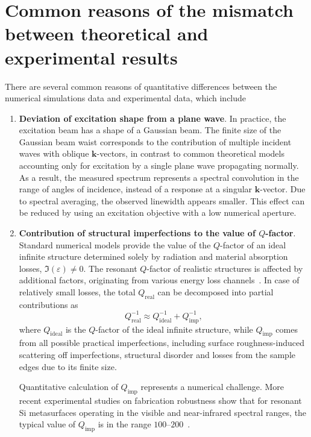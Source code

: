 \documentclass[
    reprint,
    superscriptaddress,
    a4paper,
    amsmath,amssymb,
    prb,
]{revtex4-2}
\begin{document}
\section{Common reasons of the mismatch between theoretical and experimental results}
\label{sec:mismatch_reasons}

There are several common reasons of quantitative differences between the numerical simulations data and experimental data, which include
\begin{enumerate}
	\item \textbf{Deviation of excitation shape from a plane wave}. In practice, the excitation beam has a shape of a Gaussian beam. The finite size of the Gaussian beam waist corresponds to the contribution of multiple incident waves with oblique $\mathbf{k}$-vectors, in contrast to common theoretical models accounting only for excitation by a single plane wave propagating normally. As a result, the measured spectrum represents a spectral convolution in the range of angles of incidence, instead of a response at a singular  $\mathbf{k}$-vector. Due to spectral averaging, the observed linewidth appears smaller. This effect can be reduced by using an excitation objective with a low numerical aperture.
	\item \textbf{Contribution of structural imperfections to the value of $Q$-factor}. Standard numerical models provide the value of the $Q$-factor of an ideal infinite structure determined solely by radiation and material absorption losses, $\Im(\varepsilon) \neq 0$. The resonant $Q$-factor of realistic structures is affected by additional factors, originating from various energy loss channels~\cite[Sec. 2.3]{koshelev2022PhDthesis}\cite{Hermann1984,Koshelev2020Science}. In case of relatively small losses, the total $Q_{\text{real}}$ can be decomposed into partial contributions as
	\begin{equation}
		Q^{-1}_{\text{real}} \approx Q^{-1}_{\text{ideal}}  + Q^{-1}_{\text{imp}}, 
	\end{equation}
	where $Q_{\text{ideal}}$ is the $Q$-factor of the ideal infinite structure, while $Q_{\text{imp}}$ comes from all possible practical imperfections, including surface roughness-induced scattering off imperfections, structural disorder and losses from the sample edges due to its finite size.
	
	Quantitative calculation of $Q_{\text{imp}}$ represents a numerical challenge. More recent experimental studies on fabrication robustness show that for resonant Si metasurfaces operating in the visible and near-infrared spectral ranges, the typical value of $Q_{\text{imp}}$ is in the range $100\text{--}200$~\cite{kuhne2021fabrication}. 
	

\end{enumerate}
\end{document}
